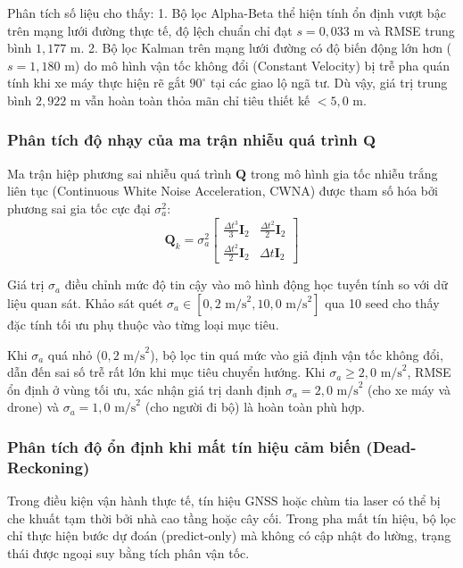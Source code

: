 Phân tích số liệu cho thấy:
1. Bộ lọc Alpha-Beta thể hiện tính ổn định vượt bậc trên mạng lưới đường thực tế, độ lệch chuẩn chỉ đạt $s = 0{,}033$ m và RMSE trung bình $1{,}177$ m.
2. Bộ lọc Kalman trên mạng lưới đường có độ biến động lớn hơn ($s = 1{,}180$ m) do mô hình vận tốc không đổi (Constant Velocity) bị trễ pha quán tính khi xe máy thực hiện rẽ gắt $90^\circ$ tại các giao lộ ngã tư. Dù vậy, giá trị trung bình $2{,}922$ m vẫn hoàn toàn thỏa mãn chỉ tiêu thiết kế $< 5{,}0$ m.

\subsubsection{Phân tích độ nhạy của ma trận nhiễu quá trình \texorpdfstring{$\mathbf{Q}$}{Q}}

\hspace{0.5cm} Ma trận hiệp phương sai nhiễu quá trình $\mathbf{Q}$ trong mô hình gia tốc nhiễu trắng liên tục (Continuous White Noise Acceleration, CWNA) được tham số hóa bởi phương sai gia tốc cực đại $\sigma_a^2$:
\begin{equation}
\mathbf{Q}_k = \sigma_a^2 \begin{bmatrix} \frac{\Delta t^3}{3} \mathbf{I}_2 & \frac{\Delta t^2}{2} \mathbf{I}_2 \\ \frac{\Delta t^2}{2} \mathbf{I}_2 & \Delta t \mathbf{I}_2 \end{bmatrix}
\label{eq:q-matrix-math}
\end{equation}

Giá trị $\sigma_a$ điều chỉnh mức độ tin cậy vào mô hình động học tuyến tính so với dữ liệu quan sát. Khảo sát quét $\sigma_a \in [0{,}2\text{ m/s}^2, 10{,}0\text{ m/s}^2]$ qua 10 seed cho thấy đặc tính tối ưu phụ thuộc vào từng loại mục tiêu.

Khi $\sigma_a$ quá nhỏ ($0{,}2$ $\text{m/s}^2$), bộ lọc tin quá mức vào giả định vận tốc không đổi, dẫn đến sai số trễ rất lớn khi mục tiêu chuyển hướng. Khi $\sigma_a \ge 2{,}0$ $\text{m/s}^2$, RMSE ổn định ở vùng tối ưu, xác nhận giá trị danh định $\sigma_a = 2{,}0\text{ m/s}^2$ (cho xe máy và drone) và $\sigma_a = 1{,}0\text{ m/s}^2$ (cho người đi bộ) là hoàn toàn phù hợp.

\subsubsection{Phân tích độ ổn định khi mất tín hiệu cảm biến (Dead-Reckoning)}

\hspace{0.5cm} Trong điều kiện vận hành thực tế, tín hiệu GNSS hoặc chùm tia laser có thể bị che khuất tạm thời bởi nhà cao tầng hoặc cây cối. Trong pha mất tín hiệu, bộ lọc chỉ thực hiện bước dự đoán (predict-only) mà không có cập nhật đo lường, trạng thái được ngoại suy bằng tích phân vận tốc.

